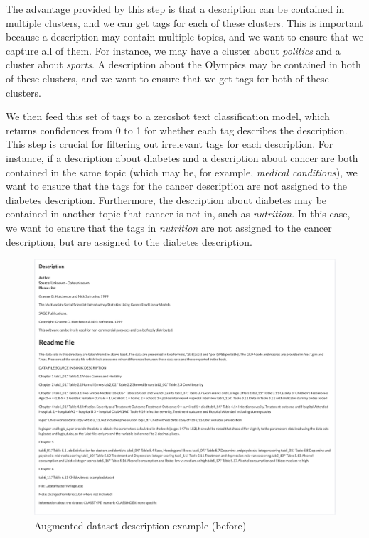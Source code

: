 \begin{enumerate}
    The advantage provided by this step is that a description can be contained in multiple clusters, and we can get tags for each of these clusters. This is important because a description may contain multiple topics, and we want to ensure that we capture all of them. For instance, we may have a cluster about \textit{politics} and a cluster about \textit{sports}. A description about the Olympics may be contained in both of these clusters, and we want to ensure that we get tags for both of these clusters.
    
    We then feed this set of tags to a zeroshot text classification model, which returns confidences from 0 to 1 for whether each tag describes the description. This step is crucial for filtering out irrelevant tags for each description. For instance, if a description about diabetes and a description about cancer are both contained in the same topic (which may be, for example, \textit{medical conditions}), we want to ensure that the tags for the cancer description are not assigned to the diabetes description. Furthermore, the description about diabetes may be contained in another topic that cancer is not in, such as \textit{nutrition}. In this case, we want to ensure that the tags in \textit{nutrition} are not assigned to the cancer description, but are assigned to the diabetes description.

\end{enumerate}

\begin{figure}[h]
    \centering
    \includegraphics[width=\textwidth]{figures/augmented_description_before.png}
    \caption{Augmented dataset description example (before)}
    \label{fig:augmented_description_before}
\end{figure}

